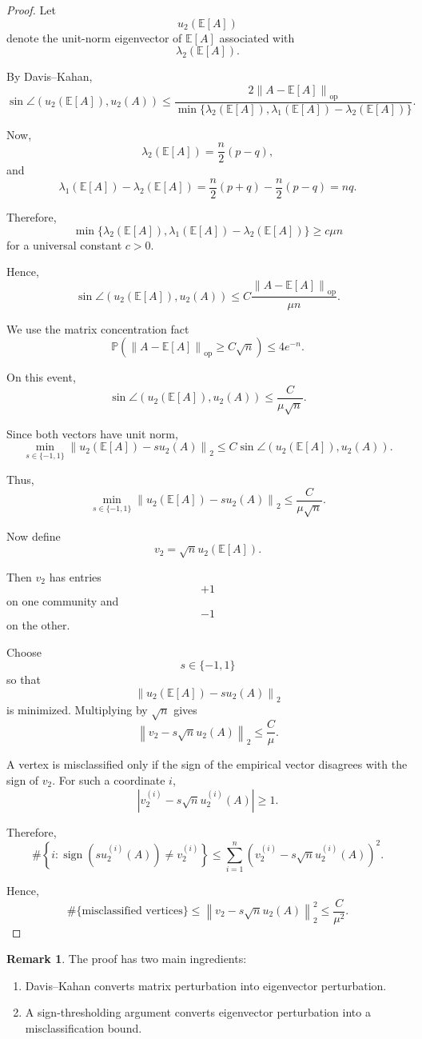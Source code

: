 \documentclass[12pt,oneside]{book}
\numberwithin{equation}{section}
\theoremstyle{definition}
\newtheorem{remark}{Remark}[section]
\theoremstyle{plain}
\theoremstyle{remark}
\newcommand{\E}{\mathbb{E}}
\newcommand{\Prob}{\mathbb{P}}
\newcommand{\norm}[1]{\left\lVert #1 \right\rVert}
\begin{document}
\begin{proof}
Let
\[
u_2(\E[A])
\]
denote the unit-norm eigenvector of $\E[A]$ associated with
\[
\lambda_2(\E[A]).
\]

By Davis--Kahan,
\[
\sin\angle(u_2(\E[A]),u_2(A))
\leq
\frac{2\norm{A-\E[A]}_{\mathrm{op}}}
{
\min\{\lambda_2(\E[A]),\lambda_1(\E[A])-\lambda_2(\E[A])\}
}.
\]

Now,
\[
\lambda_2(\E[A])
=
\frac{n}{2}(p-q),
\]
and
\[
\lambda_1(\E[A])-\lambda_2(\E[A])
=
\frac{n}{2}(p+q)-\frac{n}{2}(p-q)
=
nq.
\]

Therefore,
\[
\min\{\lambda_2(\E[A]),\lambda_1(\E[A])-\lambda_2(\E[A])\}
\geq
c\mu n
\]
for a universal constant $c>0$.

Hence,
\[
\sin\angle(u_2(\E[A]),u_2(A))
\leq
C\frac{\norm{A-\E[A]}_{\mathrm{op}}}{\mu n}.
\]

We use the matrix concentration fact
\[
\Prob\left(
\norm{A-\E[A]}_{\mathrm{op}}
\geq
C\sqrt{n}
\right)
\leq
4e^{-n}.
\]

On this event,
\[
\sin\angle(u_2(\E[A]),u_2(A))
\leq
\frac{C}{\mu\sqrt{n}}.
\]

Since both vectors have unit norm,
\[
\min_{s\in\{-1,1\}}
\norm{u_2(\E[A])-s u_2(A)}_2
\leq
C\sin\angle(u_2(\E[A]),u_2(A)).
\]

Thus,
\[
\min_{s\in\{-1,1\}}
\norm{u_2(\E[A])-s u_2(A)}_2
\leq
\frac{C}{\mu\sqrt{n}}.
\]

Now define
\[
v_2
=
\sqrt{n}u_2(\E[A]).
\]

Then $v_2$ has entries
\[
+1
\]
on one community and
\[
-1
\]
on the other.

Choose
\[
s\in\{-1,1\}
\]
so that
\[
\norm{u_2(\E[A])-s u_2(A)}_2
\]
is minimized. Multiplying by $\sqrt{n}$ gives
\[
\norm{v_2-s\sqrt{n}u_2(A)}_2
\leq
\frac{C}{\mu}.
\]

A vertex is misclassified only if the sign of the empirical vector disagrees with the sign of $v_2$. For such a coordinate $i$,
\[
|v_2^{(i)}-s\sqrt{n}u_2^{(i)}(A)|
\geq
1.
\]

Therefore,
\[
\#\left\{
i:
\operatorname{sign}(s u_2^{(i)}(A))\neq v_2^{(i)}
\right\}
\leq
\sum_{i=1}^n
\left(
v_2^{(i)}-s\sqrt{n}u_2^{(i)}(A)
\right)^2.
\]

Hence,
\[
\#\{\text{misclassified vertices}\}
\leq
\norm{v_2-s\sqrt{n}u_2(A)}_2^2
\leq
\frac{C}{\mu^2}.
\]
\end{proof}

\begin{remark}
The proof has two main ingredients:
\begin{enumerate}
\item Davis--Kahan converts matrix perturbation into eigenvector perturbation.
\item A sign-thresholding argument converts eigenvector perturbation into a misclassification bound.
\end{enumerate}
\end{remark}
\end{document}
